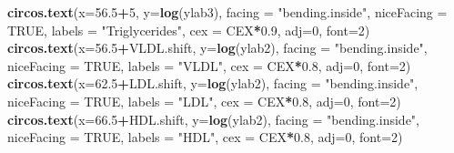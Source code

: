 \documentclass[
]{article}
\newenvironment{Shaded}{\begin{snugshade}}{\end{snugshade}}
\newcommand{\DataTypeTok}[1]{\textcolor[rgb]{0.13,0.29,0.53}{#1}}
\newcommand{\DecValTok}[1]{\textcolor[rgb]{0.00,0.00,0.81}{#1}}
\newcommand{\FloatTok}[1]{\textcolor[rgb]{0.00,0.00,0.81}{#1}}
\newcommand{\KeywordTok}[1]{\textcolor[rgb]{0.13,0.29,0.53}{\textbf{#1}}}
\newcommand{\NormalTok}[1]{#1}
\newcommand{\OperatorTok}[1]{\textcolor[rgb]{0.81,0.36,0.00}{\textbf{#1}}}
\newcommand{\OtherTok}[1]{\textcolor[rgb]{0.56,0.35,0.01}{#1}}
\newcommand{\StringTok}[1]{\textcolor[rgb]{0.31,0.60,0.02}{#1}}
\begin{document}
\begin{Shaded}
\begin{Highlighting}[]
\KeywordTok{circos.text}\NormalTok{(}\DataTypeTok{x=}\FloatTok{56.5}\OperatorTok{+}\DecValTok{5}\NormalTok{, }\DataTypeTok{y=}\KeywordTok{log}\NormalTok{(ylab3), }\DataTypeTok{facing =} \StringTok{"bending.inside"}\NormalTok{, }\DataTypeTok{niceFacing =} \OtherTok{TRUE}\NormalTok{, }\DataTypeTok{labels =} \StringTok{"Triglycerides"}\NormalTok{, }\DataTypeTok{cex =}\NormalTok{ CEX}\OperatorTok{*}\FloatTok{0.9}\NormalTok{, }\DataTypeTok{adj=}\DecValTok{0}\NormalTok{, }\DataTypeTok{font=}\DecValTok{2}\NormalTok{)}
\KeywordTok{circos.text}\NormalTok{(}\DataTypeTok{x=}\FloatTok{56.5}\OperatorTok{+}\NormalTok{VLDL.shift, }\DataTypeTok{y=}\KeywordTok{log}\NormalTok{(ylab2), }\DataTypeTok{facing =} \StringTok{"bending.inside"}\NormalTok{, }\DataTypeTok{niceFacing =} \OtherTok{TRUE}\NormalTok{, }\DataTypeTok{labels =} \StringTok{"VLDL"}\NormalTok{, }\DataTypeTok{cex =}\NormalTok{ CEX}\OperatorTok{*}\FloatTok{0.8}\NormalTok{, }\DataTypeTok{adj=}\DecValTok{0}\NormalTok{, }\DataTypeTok{font=}\DecValTok{2}\NormalTok{)}
\KeywordTok{circos.text}\NormalTok{(}\DataTypeTok{x=}\FloatTok{62.5}\OperatorTok{+}\NormalTok{LDL.shift, }\DataTypeTok{y=}\KeywordTok{log}\NormalTok{(ylab2), }\DataTypeTok{facing =} \StringTok{"bending.inside"}\NormalTok{, }\DataTypeTok{niceFacing =} \OtherTok{TRUE}\NormalTok{, }\DataTypeTok{labels =} \StringTok{"LDL"}\NormalTok{, }\DataTypeTok{cex =}\NormalTok{ CEX}\OperatorTok{*}\FloatTok{0.8}\NormalTok{, }\DataTypeTok{adj=}\DecValTok{0}\NormalTok{, }\DataTypeTok{font=}\DecValTok{2}\NormalTok{)}
\KeywordTok{circos.text}\NormalTok{(}\DataTypeTok{x=}\FloatTok{66.5}\OperatorTok{+}\NormalTok{HDL.shift, }\DataTypeTok{y=}\KeywordTok{log}\NormalTok{(ylab2), }\DataTypeTok{facing =} \StringTok{"bending.inside"}\NormalTok{, }\DataTypeTok{niceFacing =} \OtherTok{TRUE}\NormalTok{, }\DataTypeTok{labels =} \StringTok{"HDL"}\NormalTok{, }\DataTypeTok{cex =}\NormalTok{ CEX}\OperatorTok{*}\FloatTok{0.8}\NormalTok{, }\DataTypeTok{adj=}\DecValTok{0}\NormalTok{, }\DataTypeTok{font=}\DecValTok{2}\NormalTok{) }


\end{Highlighting}
\end{Shaded}
\end{document}
